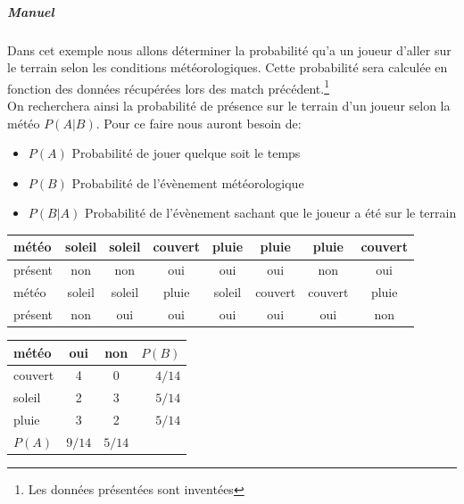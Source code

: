 \documentclass[a4paper,12pt]{article}
\begin{document}
				\subparagraph{Manuel}
					Dans cet exemple nous allons déterminer la probabilité qu'a un joueur d'aller sur le terrain selon les conditions météorologiques. Cette probabilité sera calculée en fonction des données récupérées lors des match précédent.\footnote{Les données présentées sont inventées} \\
					
					On recherchera ainsi la probabilité de présence sur le terrain d'un joueur selon la météo $P(A|B)$. Pour ce faire nous auront besoin de: 
					\begin{itemize}
						\item $P(A)$ Probabilité de jouer quelque soit le temps
						\item $P(B)$ Probabilité de l'évènement météorologique
						\item $P(B|A)$ Probabilité de l'évènement sachant que le joueur a été sur le terrain					
					\end{itemize}
				
				\begin{table}[H]
					\centering
					 \label{tab:data}
					\begin{tabular}{|l|c|c|c|c|c|c|c|}
						\hline
						météo & soleil & soleil & couvert & pluie & pluie & pluie & couvert \\
						\hline
						présent & non & non & oui & oui & oui & non & oui \\
						\hline
						\hline
						météo & soleil & soleil & pluie & soleil & couvert & couvert & pluie \\
						\hline
						présent & non & oui & oui & oui & oui & oui & non \\
						\hline
					\end{tabular}
				\end{table}
				
				\begin{table}[H]
					\centering
					 \label{tab:pab}
					\begin{tabular}{|l|c|c|r|}
						\hline
						météo & oui & non & $P(B)$\\
						\hline
						couvert & 4 & 0 & $4/14$\\
						\hline
						soleil & 2 & 3 & $5/14$\\
						\hline
						pluie & 3 & 2 & $5/14$\\
						\hline
						$P(A)$ & $9/14$ & $5/14$ & \\
						\hline
					\end{tabular}
				\end{table}
						
\end{document}
